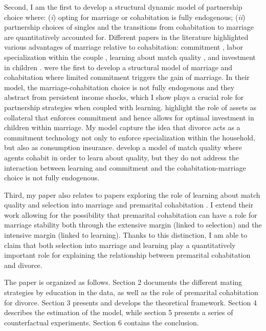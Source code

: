 \documentclass[12pt]{article}
\begin{document}
Second, I am the first to develop a structural dynamic model of partnership choice where: (\textit{i}) opting for marriage or cohabitation is fully endogenous; (\textit{ii}) partnership choices of singles and the transitions from cohabitation to marriage are quantitatively accounted for. Different papers in the literature highlighted various advantages of marriage relative to cohabitation: commitment \citep{matouschek2008,blasutto2020}, labor specialization within the couple \citep{gemici2014}, learning about match quality \citep{brien2006}, and investment in children \citep{lafortune2020}.  \citet{gemici2014} were the first to develop a structural model of marriage and cohabitation where limited commitment triggers the gain of marriage. In their model, the marriage-cohabitation choice is not fully endogenous and they abstract from persistent income shocks, which I show plays a crucial role for partnership strategies when coupled with learning. \cite{lafortune2020} highlight the role of assets as collateral that enforces commitment and hence allows for optimal investment in children within marriage. My model capture the idea that divorce acts as a commitment technology not only to enforce specialization within the household, but also as consumption insurance. \citet{brien2006} develop a model of match quality where agents cohabit in order to learn about quality, but they do not address the interaction between learning and commitment and the cohabitation-marriage choice is not fully endogenous.

Third, my paper also relates to papers exploring the role of learning about match quality \citep{marinescu2016} and selection into marriage and premarital cohabitation \citep{lillard1995,reinhold2010,svarer2004}. I extend their work allowing for the possibility that premarital cohabitation can have a role for marriage stability both through the extensive margin (linked to selection) and the intensive margin (linked to learning). Thanks to this distinction, I am able to claim that both selection into marriage and learning play a quantitatively important role for explaining the relationship between premarital cohabitation and divorce.

The paper is organized as follows. Section 2 documents the different mating strategies by education in the data, as well as the role of premarital cohabitation for divorce. Section 3 presents and develops the theoretical framework. Section 4 describes the estimation of the model, while section 5 presents a series of counterfactual experiments. Section 6 contains the conclusion.
\end{document}
